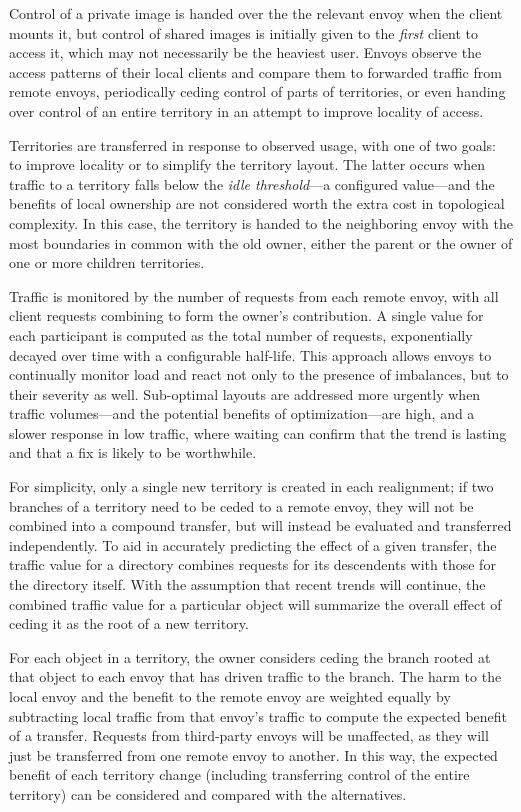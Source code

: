 Control of a private image is handed over the the relevant envoy when the client mounts it, but control of shared images is initially given to the \emph{first} client to access it, which may not necessarily be the heaviest user. Envoys observe the access patterns of their local clients and compare them to forwarded traffic from remote envoys, periodically ceding control of parts of territories, or even handing over control of an entire territory in an attempt to improve locality of access.

Territories are transferred in response to observed usage, with one of two goals: to improve locality or to simplify the territory layout. The latter occurs when traffic to a territory falls below the \emph{idle threshold}---a configured value---and the benefits of local ownership are not considered worth the extra cost in topological complexity. In this case, the territory is handed to the neighboring envoy with the most boundaries in common with the old owner, either the parent or the owner of one or more children territories.

Traffic is monitored by the number of requests from each remote envoy, with all client requests combining to form the owner's contribution. A single value for each participant is computed as the total number of requests, exponentially decayed over time with a configurable half-life. This approach allows envoys to continually monitor load and react not only to the presence of imbalances, but to their severity as well. Sub-optimal layouts are addressed more urgently when traffic volumes---and the potential benefits of optimization---are high, and a slower response in low traffic, where waiting can confirm that the trend is lasting and that a fix is likely to be worthwhile.

For simplicity, only a single new territory is created in each realignment; if two branches of a territory need to be ceded to a remote envoy, they will not be combined into a compound transfer, but will instead be evaluated and transferred independently. To aid in accurately predicting the effect of a given transfer, the traffic value for a directory combines requests for its descendents with those for the directory itself. With the assumption that recent trends will continue, the combined traffic value for a particular object will summarize the overall effect of ceding it as the root of a new territory.

For each object in a territory, the owner considers ceding the branch rooted at that object to each envoy that has driven traffic to the branch. The harm to the local envoy and the benefit to the remote envoy are weighted equally by subtracting local traffic from that envoy's traffic to compute the expected benefit of a transfer. Requests from third-party envoys will be unaffected, as they will just be transferred from one remote envoy to another. In this way, the expected benefit of each territory change (including transferring control of the entire territory) can be considered and compared with the alternatives.

